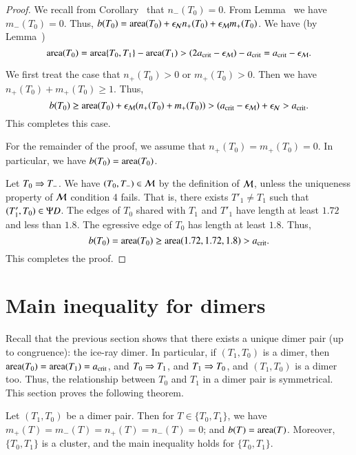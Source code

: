 \begin{proof}
  We recall from Corollary~ that $n_-(T_0)=0$.  From
  Lemma~ we have $m_-(T_0)=0$.  Thus, $b(T_0) =
  {\operatorname{area}}(T_0) + \epsilon_{\mathcal N} n_+(T_0) + \epsilon_{\mathcal M} m_+(T_0)$.  We have
  (by Lemma~)
\[
{\operatorname{area}}(T_0) = {\operatorname{area}}\{T_0,T_1\} - {\operatorname{area}}(T_1) 
> (2a_\text{crit}-\epsilon_{\mathcal M}) -a_\text{crit} = a_\text{crit} - \epsilon_{\mathcal M}.
\]

We first treat the case that $n_+(T_0)>0$ or $m_+(T_0)>0$.  Then we
have $n_+(T_0)+m_+(T_0)\ge 1$.  Thus,
\[
b(T_0) \ge {\operatorname{area}}(T_0) + \epsilon_{\mathcal M} (n_+(T_0)+m_+(T_0)) > (a_\text{crit} - \epsilon_{\mathcal M})
+ \epsilon_{\mathcal N} > a_\text{crit}.
\]
This completes this case.

For the remainder of the proof, we assume that $n_+(T_0)=m_+(T_0)=0$.  In
particular, we have $b(T_0) = {\operatorname{area}}(T_0)$.


Let $T_0\Rightarrow T_-$.  We have $(T_0,T_-)\in\mathcal M$ by the definition of $\mathcal M$,
unless the uniqueness property of $\mathcal M$ condition 4 fails.  That is,
there exists $T'_1\ne T_1$ such that $(T'_1,T_0)\in\Psi D$.  The edges of
$T_0$ shared with $T_1$ and $T'_1$ have length at least $1.72$ and
less than $1.8$.  The egressive edge of $T_0$ has length at least
$1.8$.  Thus,
\[
b(T_0) = {\operatorname{area}} (T_0) \ge {\operatorname{area}}(1.72,1.72,1.8) > a_\text{crit}.
\]
This completes the proof.
\end{proof}


\section{Main inequality for dimers}

Recall that the previous section shows that there exists a unique
dimer pair (up to congruence): the ice-ray dimer.  In particular, if
$(T_1,T_0)$ is a dimer, then ${\operatorname{area}}(T_0)={\operatorname{area}}(T_1)=a_\text{crit}$, and
$T_0\Rightarrow T_1$, and $T_1\Rightarrow T_0$, and $(T_1,T_0)$ is a dimer too.  Thus,
the relationship between $T_0$ and $T_1$ in a dimer pair is
symmetrical.  This section proves the following theorem.

\begin{theorem} 
  Let $(T_1,T_0)$ be a dimer pair.  Then for $T\in\{T_0,T_1\}$, we have
  $m_+(T)=m_-(T) = n_+(T)=n_-(T) = 0$; and $b(T) = {\operatorname{area}}(T)$.
  Moreover, $\{T_0,T_1\}$ is a cluster, and the main inequality holds
  for $\{T_0,T_1\}$.
\end{theorem}

